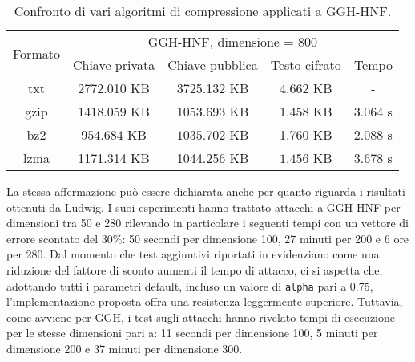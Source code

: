 \begin{table}[H]
    \centering
    \begin{tabular}{|c|c|c|c|c|}
    \hline
    \multirow{2}{*}{Formato} & \multicolumn{4}{c|}{GGH-HNF, dimensione = 800}\\ \cline{2-5} 
     & Chiave privata & Chiave pubblica & Testo cifrato & Tempo \\ \hline
    txt & 2772.010 KB& 3725.132 KB& 4.662 KB& - \\ \hline
    gzip & 1418.059 KB& 1053.693 KB& 1.458 KB& 3.064 s\\ \hline
    bz2 & $\mathbf{954.684}$ KB& $\mathbf{1035.702}$ KB& 1.760 KB& $\mathbf{2.088}$ s\\ \hline
    lzma & 1171.314 KB& 1044.256 KB& $\mathbf{1.456}$ KB& 3.678 s\\ \hline
    \end{tabular}
    \caption{Confronto di vari algoritmi di compressione applicati a GGH-HNF.}
    \label{tab:GGHHNF_differenze}

\end{table}

La stessa affermazione può essere dichiarata anche per quanto riguarda i risultati ottenuti
da Ludwig. I suoi esperimenti hanno trattato attacchi a GGH-HNF per dimensioni tra 
50 e 280 rilevando in particolare i seguenti tempi con un vettore di errore scontato
del 30\%: 50 secondi per dimensione 100, 27 minuti per 200 e 6 ore per 280. 
Dal momento che test aggiuntivi riportati in \cite{HNF04} evidenziano come una riduzione del 
fattore di sconto aumenti il tempo di attacco, ci si aspetta che, adottando tutti i parametri default,
incluso un valore di \texttt{alpha} pari a 0.75, l'implementazione proposta offra una resistenza leggermente superiore. 
Tuttavia, come avviene per 
GGH, i test sugli attacchi hanno rivelato tempi di 
esecuzione per le stesse dimensioni pari a: 11 secondi per dimensione 100, 5 minuti per 
dimensione 200 e 37 minuti per dimensione 300.